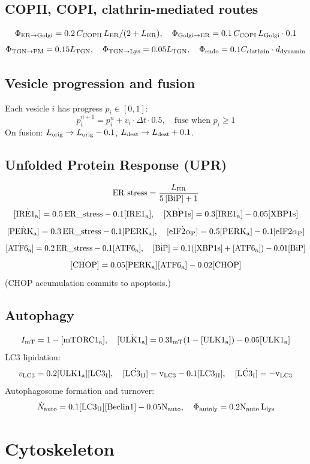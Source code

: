 \documentclass[11pt,a4paper]{article}
\newcommand{\eq}[1]{\begin{equation}#1\end{equation}}
\begin{document}
\subsection{COPII, COPI, clathrin-mediated routes}
\[
\Phi_{\rm ER\to Golgi}=0.2\,C_{\rm COPII}\,L_{\rm ER}/(2+L_{\rm ER}),\quad \Phi_{\rm Golgi\to ER}=0.1\,C_{\rm COPI}\,L_{\rm Golgi}\cdot 0.1
\]
\[
\Phi_{\rm TGN\to PM}=0.15 L_{\rm TGN},\quad \Phi_{\rm TGN\to Lys}=0.05 L_{\rm TGN},\quad \Phi_{\rm endo}=0.1 C_{\rm clathrin}\cdot d_{\rm dynamin}
\]

\subsection{Vesicle progression and fusion}
Each vesicle $i$ has progress $p_i\in[0,1]$:
\eq{ p_i^{n+1} = p_i^n + v_i\cdot\Delta t\cdot 0.5,\quad \text{fuse when }p_i\ge1 }
On fusion: $L_{\rm orig}\to L_{\rm orig}-0.1$, $L_{\rm dest}\to L_{\rm dest}+0.1$.

\subsection{Unfolded Protein Response (UPR)}
\eq{ \mathrm{ER\ stress} = \frac{L_{\rm ER}}{5\,[\rm BiP]+1} }
\eq{ \dot{[\rm IRE1_a]}=0.5\,\mathrm{ER\_stress}-0.1[\rm IRE1_a],\quad \dot{[\rm XBP1s]}=0.3[\rm IRE1_a]-0.05[\rm XBP1s] }
\eq{ \dot{[\rm PERK_a]}=0.3\,\mathrm{ER\_stress}-0.1[\rm PERK_a],\quad \dot{[\rm eIF2\alpha_P]}=0.5[\rm PERK_a]-0.1[\rm eIF2\alpha_P] }
\eq{ \dot{[\rm ATF6_a]}=0.2\,\mathrm{ER\_stress}-0.1[\rm ATF6_a],\quad \dot{[\rm BiP]}=0.1([\rm XBP1s]+[\rm ATF6_a])-0.01[\rm BiP] }
\eq{ \dot{[\rm CHOP]}=0.05[\rm PERK_a][\rm ATF6_a]-0.02[\rm CHOP] }
(CHOP accumulation commits to apoptosis.)

\subsection{Autophagy}
\eq{ I_{\rm mT}=1-[\rm mTORC1_a],\quad \dot{[\rm ULK1_a]}=0.3 I_{\rm mT}(1-[\rm ULK1_a])-0.05[\rm ULK1_a] }
LC3 lipidation:
\eq{ v_{\rm LC3}=0.2[\rm ULK1_a][\rm LC3_I],\quad \dot{[\rm LC3_{II}]}=v_{\rm LC3}-0.1[\rm LC3_{II}],\quad \dot{[\rm LC3_I]}=-v_{\rm LC3} }
Autophagosome formation and turnover:
\eq{ \dot N_{\rm auto} = 0.1[\rm LC3_{II}][\rm Beclin1] - 0.05 N_{\rm auto},\quad \Phi_{\rm autoly}=0.2 N_{\rm auto}\,L_{\rm lys} }

\clearpage
\section{Cytoskeleton}
\label{sec:cytoskel}
\end{document}

